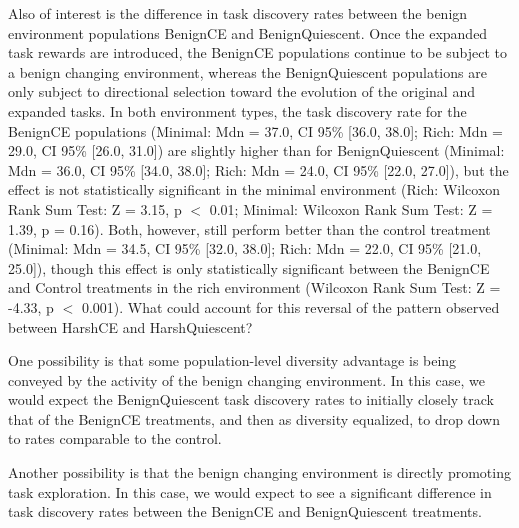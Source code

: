 \documentclass[10pt,letterpaper]{article}
\begin{document}
Also of interest
is the difference in task discovery rates between the benign environment populations BenignCE and BenignQuiescent. Once the expanded task rewards are introduced, the BenignCE populations continue to be subject to a benign changing environment, whereas the BenignQuiescent populations are only subject to directional selection toward the evolution of the original and expanded tasks. In both environment types, the task discovery rate for the BenignCE populations (Minimal: Mdn = 37.0, CI 95\% [36.0, 38.0]; Rich: Mdn = 29.0, CI 95\% [26.0, 31.0]) are slightly higher than for BenignQuiescent (Minimal: Mdn = 36.0, CI 95\% [34.0, 38.0]; Rich: Mdn = 24.0, CI 95\% [22.0, 27.0]), but the effect is not statistically significant in the minimal environment (Rich: Wilcoxon Rank Sum Test: Z = 3.15, p $<$ 0.01; Minimal: Wilcoxon Rank Sum Test: Z = 1.39, p = 0.16). Both, however, still perform better than the control treatment (Minimal: Mdn = 34.5, CI 95\% [32.0, 38.0]; Rich: Mdn = 22.0, CI 95\% [21.0, 25.0]), though this effect is only statistically significant between the BenignCE and Control treatments in the rich environment (Wilcoxon Rank Sum Test: Z = -4.33, p $<$ 0.001). What could account for this reversal of the pattern observed between HarshCE and HarshQuiescent?


One possibility is that some population-level diversity advantage is being conveyed by the activity of the benign changing environment. In this case, we would expect the BenignQuiescent task discovery rates to initially closely track that of the BenignCE treatments, and then as diversity equalized, to drop down to rates comparable to the control.

Another possibility is that the benign changing environment is directly promoting task exploration. In this case, we would expect to see a significant difference in task discovery rates between the BenignCE and BenignQuiescent treatments.
\end{document}
